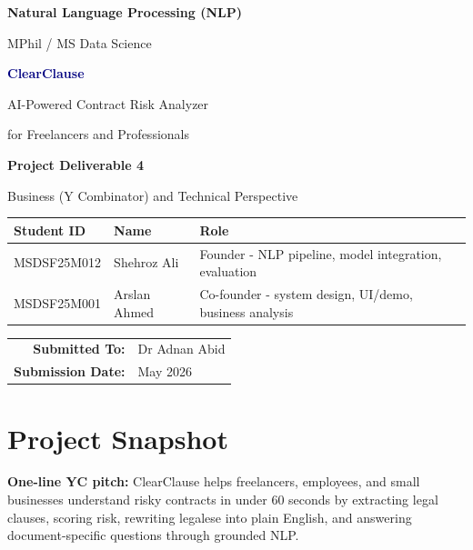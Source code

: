 \documentclass[11pt,a4paper]{article}
\begin{document}
\begin{titlepage}
\centering
\vspace*{0.6in}
{\Large\bfseries Natural Language Processing (NLP)\par}
\vspace{0.15in}
{\large MPhil / MS Data Science\par}
\vspace{0.5in}
{\Huge\bfseries\textcolor{Navy}{ClearClause}\par}
\vspace{0.12in}
{\Large AI-Powered Contract Risk Analyzer\par}
\vspace{0.08in}
{\large for Freelancers and Professionals\par}
\vspace{0.45in}
{\Large\bfseries Project Deliverable 4\par}
\vspace{0.08in}
{\large Business (Y Combinator) and Technical Perspective\par}
\vspace{0.5in}
\begin{tabular}{lll}
\toprule
\textbf{Student ID} & \textbf{Name} & \textbf{Role} \\
\midrule
MSDSF25M012 & Shehroz Ali & Founder - NLP pipeline, model integration, evaluation \\
MSDSF25M001 & Arslan Ahmed & Co-founder - system design, UI/demo, business analysis \\
\bottomrule
\end{tabular}
\vfill
\begin{tabular}{rl}
\textbf{Submitted To:} & Dr Adnan Abid \\
\textbf{Submission Date:} & May 2026 \\
\end{tabular}
\end{titlepage}

\section*{Project Snapshot}

\begin{pitchbox}
\textbf{One-line YC pitch:} ClearClause helps freelancers, employees, and small businesses understand risky contracts in under 60 seconds by extracting legal clauses, scoring risk, rewriting legalese into plain English, and answering document-specific questions through grounded NLP.
\end{pitchbox}
\end{document}
